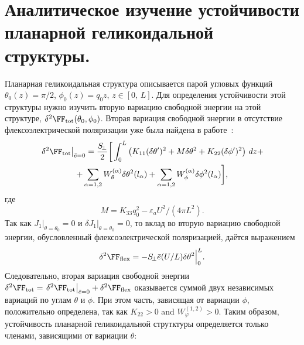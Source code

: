 \chapter{Аналитическое изучение устойчивости планарной геликоидальной структуры.}\label{ch:ch3}

Планарная геликоидальная структура описывается парой угловых функций $\theta_0(z) = \pi/2$, $\phi_0(z) = q_0 z$, $z\in[0,\,L]$.
Для определения устойчивости этой структуры нужно изучить вторую вариацию свободной энергии на этой структуре, $\delta^2\FF_\mathrm{tot}(\theta_0,\phi_0)$. 
Вторая вариация свободной энергии в отсутствие флексоэлектрической поляризации уже была найдена в работе~\cite{VAR2013}:
\begin{multline}\label{eq:F2_on_planar_helicoidal}
\left.\delta^2\FF_{\text{tot}}\right|_{\bar{e}=0}
=\frac{S_{\!\bot}}{2}\bigg[\int_{0}^{L}
\left(K_{11}(\delta\theta')^2+M\delta\theta^2+K_{22}(\delta\phi')^2\right)\, dz +\\
+\sum_{\alpha=1,2}W_\theta^{(\alpha)}\delta\theta^2(l_\alpha)
+\sum_{\alpha=1,2}W_\phi^{(\alpha)}\delta\phi^2(l_\alpha)\bigg],
\end{multline}
где
\begin{equation}
M = K_{33}q_0^2 - \varepsilon_a U^2/(4\pi L^2).
\end{equation}
Так как $J_1\big|_{\theta = \theta_0}=0$ и $\delta J_1\big|_{\theta = \theta_0}=0$, то вклад во вторую вариацию свободной энергии, обусловленный флексоэлектрической поляризацией, даётся выражением
\begin{equation}\label{get_d2Flex}
\delta^2\FF_{\mathrm{flex}}
=-S_{\!\bot}\bar{e} (U/L) \delta\theta^2\Big|_0^L.
\end{equation}
Следовательно, вторая вариация свободной энергии $\delta^2\FF_\mathrm{tot}=\left.\delta^2\FF_{\text{tot}}\right|_{\bar{e}=0} + \delta^2\FF_{\mathrm{flex}}$ оказывается суммой двух независимых вариаций по углам $\theta$ и $\phi$.
При этом часть, зависящая от вариации $\phi$, положительно определена, так как $K_{22}>0$ and $W^{(1,2)}_\varphi>0$.
Таким образом, устойчивость планарной геликоидальной струтктуры определяется только членами, зависящими от вариации $\theta$:

